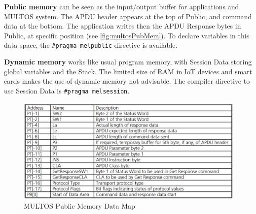 \textbf{Public memory} can be seen as the input/output buffer for applications and MULTOS system. The APDU header appears at the top of Public, and command data at the bottom. The application writes then the APDU Response bytes in Public, at specific position (see \autoref{fig:multosPubMem}). To declare variables in this data space, the \texttt{\#pragma melpublic} directive is available.

\textbf{Dynamic memory} works like usual program memory, with Session Data storing global variables and the Stack. The limited size of RAM in IoT devices and smart cards makes the use of dynamic memory not advisable. The compiler directive to use Session Data is \texttt{\#pragma melsession}.


\begin{figure}[bth]
	\begin{center}
		\includegraphics[width=\linewidth]{gfx/multosPubMem}
	\end{center}
	\caption{MULTOS Public Memory Data Map}
	\label{fig:multosPubMem}
\end{figure}


\hfil


